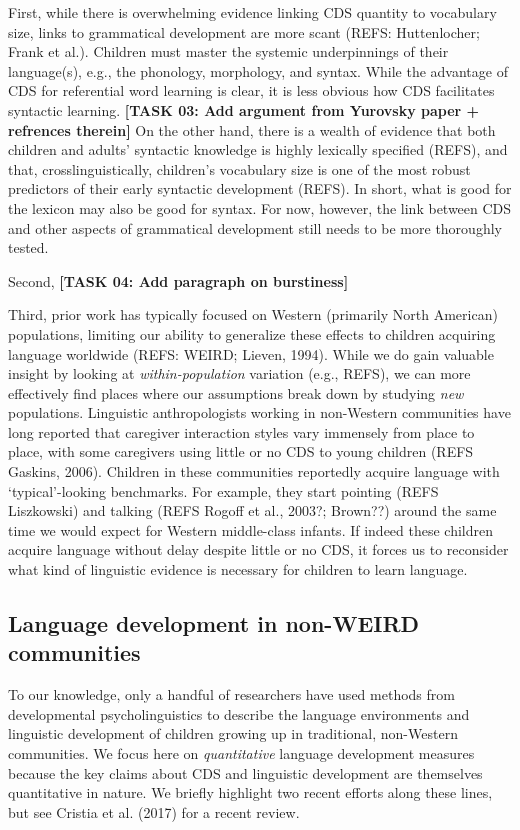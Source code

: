\documentclass[man]{apa6}
\theoremstyle{definition}
\theoremstyle{definition}
\theoremstyle{definition}
\theoremstyle{remark}
\begin{document}
First, while there is overwhelming evidence linking CDS quantity to
vocabulary size, links to grammatical development are more scant (REFS:
Huttenlocher; Frank et al.). Children must master the systemic
underpinnings of their language(s), e.g., the phonology, morphology, and
syntax. While the advantage of CDS for referential word learning is
clear, it is less obvious how CDS facilitates syntactic learning.
\textbf{{[}TASK 03: Add argument from Yurovsky paper + refrences
therein{]}} On the other hand, there is a wealth of evidence that both
children and adults' syntactic knowledge is highly lexically specified
(REFS), and that, crosslinguistically, children's vocabulary size is one
of the most robust predictors of their early syntactic development
(REFS). In short, what is good for the lexicon may also be good for
syntax. For now, however, the link between CDS and other aspects of
grammatical development still needs to be more thoroughly tested.

Second, \textbf{{[}TASK 04: Add paragraph on burstiness{]}}

Third, prior work has typically focused on Western (primarily North
American) populations, limiting our ability to generalize these effects
to children acquiring language worldwide (REFS: WEIRD; Lieven, 1994).
While we do gain valuable insight by looking at \emph{within-population}
variation (e.g., REFS), we can more effectively find places where our
assumptions break down by studying \emph{new} populations. Linguistic
anthropologists working in non-Western communities have long reported
that caregiver interaction styles vary immensely from place to place,
with some caregivers using little or no CDS to young children (REFS
Gaskins, 2006). Children in these communities reportedly acquire
language with `typical'-looking benchmarks. For example, they start
pointing (REFS Liszkowski) and talking (REFS Rogoff et al., 2003?;
Brown??) around the same time we would expect for Western middle-class
infants. If indeed these children acquire language without delay despite
little or no CDS, it forces us to reconsider what kind of linguistic
evidence is necessary for children to learn language.

\subsection{Language development in non-WEIRD
communities}\label{language-development-in-non-weird-communities}

To our knowledge, only a handful of researchers have used methods from
developmental psycholinguistics to describe the language environments
and linguistic development of children growing up in traditional,
non-Western communities. We focus here on \emph{quantitative} language
development measures because the key claims about CDS and linguistic
development are themselves quantitative in nature. We briefly highlight
two recent efforts along these lines, but see Cristia et al. (2017) for
a recent review.
\end{document}
